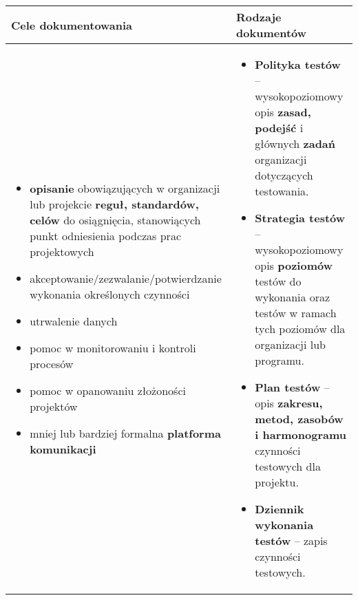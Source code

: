 \documentclass[../main.tex]{subfiles}
\begin{document}
    \begin{table}[H]
        \begin{center}
            \begin{tabular}{p{8cm} | p{8cm}}
                \textbf{Cele dokumentowania} & \textbf{Rodzaje dokumentów}\\
                \hline
                \begin{itemize}
                    \item \textbf{opisanie} obowiązujących w organizacji lub projekcie \textbf{reguł, standardów, celów} do osiągnięcia, stanowiących punkt odniesienia podczas prac projektowych
                    \item akceptowanie/zezwalanie/potwierdzanie wykonania określonych czynności
                    \item utrwalenie danych
                    \item pomoc w monitorowaniu i kontroli procesów
                    \item pomoc w opanowaniu złożoności projektów
                    \item mniej lub bardziej formalna \textbf{platforma komunikacji}
                \end{itemize}
                &
                \begin{itemize}
                    \item \textbf{Polityka testów} – wysokopoziomowy opis \textbf{zasad, podejść} i głównych \textbf{zadań} organizacji dotyczących testowania.
                    \item \textbf{Strategia testów} – wysokopoziomowy opis \textbf{poziomów} testów do wykonania oraz testów w ramach tych poziomów dla organizacji lub programu.
                    \item \textbf{Plan testów} – opis \textbf{zakresu, metod, zasobów i harmonogramu} czynności testowych dla projektu.
                    \item \textbf{Dziennik wykonania testów} – zapis czynności testowych.
                \end{itemize}\\
                \hline
            \end{tabular}
        \end{center}
    \end{table}
\end{document}
